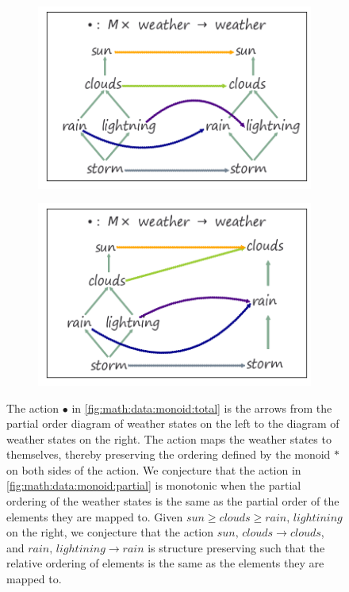 \documentclass[../main.tex]{subfiles}
\begin{document}
\begin{figure}[H]
    \begin{subfigure}{.5\textwidth}
        \includegraphics[width=\textwidth]{figures/math/monoid_total.png}
        \caption{}
        \label{fig:math:data:monoid:total}
    \end{subfigure}
    \begin{subfigure}{.5\textwidth}
        \includegraphics[width=1\textwidth]{figures/math/monoid_partial.png}
        \caption{}
        \label{fig:math:data:monoid:partial}
    \end{subfigure}
    \caption{The action $\bullet$ in \autoref{fig:math:data:monoid:total} is the arrows from the partial order diagram of weather states on the left to the diagram of weather states on the right. The action maps the weather states to themselves, thereby preserving the ordering defined by the monoid $\ast$ on both sides of the action. We conjecture that the action in \autoref{fig:math:data:monoid:partial} is monotonic when the partial ordering of the weather states is the same as the partial order of the elements they are mapped to. Given $sun \geq clouds\geq rain,\, lightining$ on the right, we conjecture that the action  $sun,\, clouds \rightarrow clouds$, and $rain,\, lightining \rightarrow rain$ is structure preserving such that the relative ordering of elements is the same as the elements they are mapped to.}
    \label{fig:math:data:monoid}
\end{figure}
\end{document}
